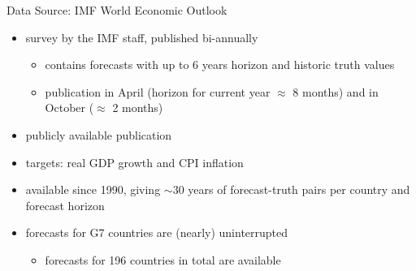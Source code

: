 \documentclass[en]{sdqbeamer}
\begin{document}
   
\begin{frame}{Data Source: IMF World Economic Outlook}
	\begin{itemize}
		\item survey by the IMF staff, published bi-annually
		\begin{itemize}
            \item contains forecasts with up to 6 years horizon and historic truth values
		    \item publication in April (horizon for current year $\approx$ 8 months) and in October ($\approx$ 2 months)
		\end{itemize}
    \item publicly available publication
    \item targets: real GDP growth and CPI inflation 
    \item available since 1990, giving $\sim$30 years of forecast-truth pairs per country and forecast horizon
    \item forecasts for G7 countries are (nearly) uninterrupted
    \begin{itemize}
        \item forecasts for 196 countries in total are available
    \end{itemize}
	\end{itemize}
\end{frame}
\end{document}
